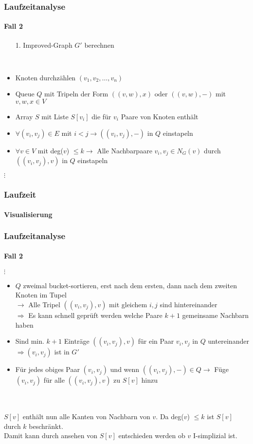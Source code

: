 
\begin{frame}
\frametitle{Laufzeitanalyse}
\framesubtitle{Fall 2}

\begin{enumerate}
	\item[1.] Improved-Graph $G'$ berechnen
\end{enumerate}
\ \\
\begin{itemize} %
	\item Knoten durchzählen $(v_1, v_2, \dots, v_n)$
	\item Queue $Q$ mit Tripeln der Form $((v,w),x)$ oder $((v,w),-)$ mit $v,w,x \in V$
	\item Array $S$ mit Liste $S[v_i]$ die für $v_i$ Paare von Knoten enthält
	\item $\forall (v_i, v_j) \in E$ mit $i < j \rightarrow ((v_i, v_j), -)$ in $Q$ einstapeln
	\item $\forall v \in V$ mit deg($v$) $\leq k \rightarrow$ Alle Nachbarpaare $v_i, v_j \in N_G(v)$ durch $((v_i, v_j),v)$ in $Q$ einstapeln
\end{itemize}
$\vdots$

\end{frame}


\begin{frame}
\frametitle{Laufzeit}
\framesubtitle{Visualisierung}


\end{frame}


\begin{frame}
\frametitle{Laufzeitanalyse}
\framesubtitle{Fall 2}

$\vdots$
\begin{itemize}
	\item $Q$ zweimal bucket-sortieren, erst nach dem ersten, dann nach dem zweiten Knoten im Tupel \\
	$\rightarrow$ Alle Tripel $((v_i, v_j),v)$ mit gleichem $i,j$ sind hintereinander \\
	$\Rightarrow$ Es kann schnell geprüft werden welche Paare $k+1$ gemeinsame Nachbarn haben
	\item Sind min. $k+1$ Einträge $((v_i, v_j), v)$ für ein Paar $v_i, v_j$ in $Q$ untereinander $\Rightarrow (v_i, v_j)$ ist in $G'$
	\item Für jedes obiges Paar $(v_i, v_j)$ und wenn $((v_i, v_j), -) \in Q \rightarrow$ Füge $(v_i, v_j)$ für alle $((v_i, v_j), v)$ zu $S[v]$ hinzu
\end{itemize}
\ \\
\ \\

$S[v]$ enthält nun alle Kanten von Nachbarn von $v$. Da deg($v$) $\leq k$ ist $S[v]$ durch $k$ beschränkt. \\
Damit kann durch ansehen von $S[v]$ entschieden werden ob $v$ I-simplizial ist.
\end{frame}



